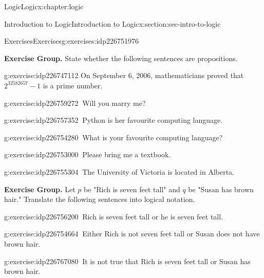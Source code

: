 \documentclass[twoside,10pt,]{book}
\numberwithin{equation}{section}
\begin{document}
\begin{chapterptx}{Logic}{}{Logic}{}{}{x:chapter:logic}
\begin{sectionptx}{Introduction to Logic}{}{Introduction to Logic}{}{}{x:section:sec-intro-to-logic}
\begin{exercises-subsection}{Exercises}{}{Exercises}{}{}{g:exercises:idp226751976}
\par\medskip\noindent%
\textbf{Exercise Group.}\space\space%
State whether the following sentences are propositions.\begin{exercisegroup}
\begin{divisionexerciseeg}{1}{}{}{g:exercise:idp226747112}%
On September 6, 2006, mathematicians proved that \(2^{32582657}-1\) is a prime number.\end{divisionexerciseeg}%
\begin{divisionexerciseeg}{2}{}{}{g:exercise:idp226759272}%
\(\ \)Will you marry me?\end{divisionexerciseeg}%
\begin{divisionexerciseeg}{3}{}{}{g:exercise:idp226757352}%
\(\ \)Python is her favourite computing language.\end{divisionexerciseeg}%
\begin{divisionexerciseeg}{4}{}{}{g:exercise:idp226754280}%
\(\ \)What is your favourite computing language?\end{divisionexerciseeg}%
\begin{divisionexerciseeg}{5}{}{}{g:exercise:idp226753000}%
\(\ \)Please bring me a textbook.\end{divisionexerciseeg}%
\begin{divisionexerciseeg}{6}{}{}{g:exercise:idp226755304}%
\(\ \)The University of Victoria is located in Alberta.\end{divisionexerciseeg}%
\end{exercisegroup}
\par\medskip\noindent
\par\medskip\noindent%
\textbf{Exercise Group.}\space\space%
Let \(p\) be "Rich is seven feet tall" and \(q\) be "Susan has brown hair." Translate the following sentences into logical notation.\begin{exercisegroup}
\begin{divisionexerciseeg}{7}{}{}{g:exercise:idp226756200}%
\(\ \)Rich is seven feet tall or he is seven feet tall.\end{divisionexerciseeg}%
\begin{divisionexerciseeg}{8}{}{}{g:exercise:idp226754664}%
\(\ \)Either Rich is not seven feet tall or Susan does not have brown hair.\end{divisionexerciseeg}%
\begin{divisionexerciseeg}{9}{}{}{g:exercise:idp226767080}%
\(\ \)It is not true that Rich is seven feet tall or Susan has brown hair.\end{divisionexerciseeg}%

\end{exercisegroup}
\end{exercises-subsection}
\end{sectionptx}
\end{chapterptx}
\end{document}
